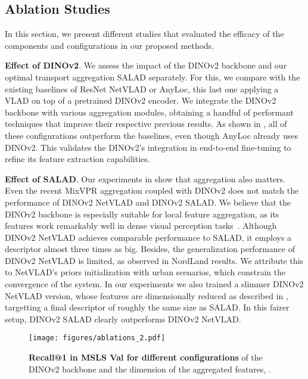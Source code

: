 \documentclass[10pt,twocolumn,letterpaper]{article}
\begin{document}
\subsection{Ablation Studies}
\label{subsec:ablation}


In this section, we present different studies that evaluated the efficacy of the components and configurations in our proposed methods.

\textbf{Effect of DINOv2}. 
We assess the impact of the DINOv2 backbone and our optimal transport aggregation SALAD separately. For this, we compare with the existing baselines of ResNet NetVLAD or AnyLoc, this last one applying a VLAD on top of a pretrained DINOv2 encoder.
We integrate the DINOv2 backbone with various aggregation modules, obtaining a handful of performant techniques that improve their respective previous results. As shown in , all of these configurations outperform the baselines, even though AnyLoc already uses DINOv2. This validates the DINOv2's integration in end-to-end fine-tuning to refine its feature extraction capabilities.

\textbf{Effect of SALAD}. 
Our experiments in  show that aggregation also matters. Even the recent MixVPR aggregation coupled with DINOv2 does not match the performance of DINOv2 NetVLAD and DINOv2 SALAD. We believe that the DINOv2 backbone is especially suitable for local feature aggregation, as its features work remarkably well in dense visual perception tasks~\cite{oquab2023dinov2, kappeler2023few,yao2023vitmatte}. Although DINOv2 NetVLAD achieves comparable performance to SALAD, it employs a descriptor almost three times as big. Besides, the generalization performance of DINOv2 NetVLAD is limited, as observed in NordLand results. We attribute this to NetVLAD's priors initialization with urban scenarios, which constrain the convergence of the system. In our experiments we also trained a slimmer DINOv2 NetVLAD version, whose features are dimensionally reduced as described in , targetting a final descriptor of roughly the same size as SALAD. In this fairer setup, DINOv2 SALAD clearly outperforms DINOv2 NetVLAD.




\begin{figure}[t]
  \centering
   \texttt{[image: figures/ablations\_2.pdf]}
   \caption{\textbf{Recall@1 in MSLS Val for different configurations} of the DINOv2 backbone and the dimension of the aggregated features, .}
   \label{fig:plot_ablations}
\end{figure}\vspace{1em}
\end{document}
